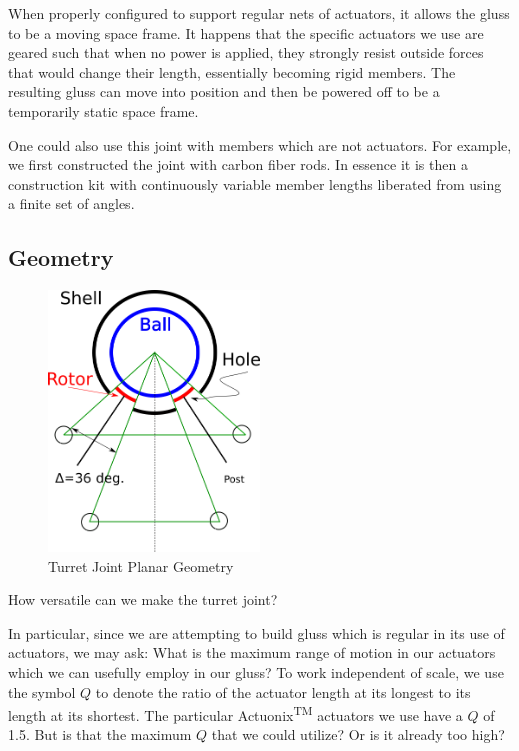 \documentclass[11pt]{article}
\begin{document}
When properly configured to support regular nets of actuators,
it allows the gluss to be a moving space frame. It happens that the specific actuators we use
are geared such that when no power is applied, they strongly resist outside forces that would change their length,
essentially becoming rigid members.
The resulting gluss
can move into position and then be powered off to be a temporarily static space frame.

One could also use this joint with members which are not actuators. For example, we first
constructed the joint with carbon fiber rods. In essence it is then a construction kit with continuously
variable member lengths liberated from using a finite set of angles.

\subsection{Geometry}

\begin{figure}[H]
  \centering
  \includegraphics[width=0.5\textwidth]{figures/SimplifiedConstraintDrawing.png}
    \caption[Turret Joint Planar Geometry]{Turret Joint Planar Geometry}
      \label{simplified-constraint-drawing}
\end{figure}

How versatile can we make the turret joint?

In particular, since we are attempting to build gluss which is regular in its use of actuators, we may ask:
What is the maximum range of motion in our
actuators which we can usefully employ in our gluss?
To work independent of scale, we use the symbol $Q$ to denote the ratio of the actuator length at its
longest to its length at its shortest.
The particular Actuonix\textsuperscript{TM} actuators we use have a $Q$ of 1.5. But is that the maximum $Q$ that we could utilize? Or is
it already too high?
\end{document}
